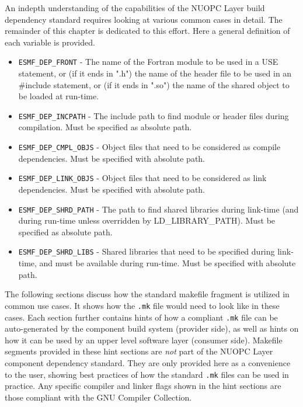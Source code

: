 An indepth understanding of the capabilities of the NUOPC Layer build dependency standard requires looking at various common cases in detail. The remainder of this chapter is dedicated to this effort. Here a general definition of each variable is provided.

\begin{itemize}

\item {\tt ESMF\_DEP\_FRONT} - The name of the Fortran module to be used in a USE statement, or (if it ends in ".h") the name of the header file to be used in an \#include statement, or (if it ends in ".so") the name of the shared object to be loaded at run-time.

\item {\tt ESMF\_DEP\_INCPATH} - The include path to find module or header files during compilation. Must be specified as absolute path.

\item {\tt ESMF\_DEP\_CMPL\_OBJS} - Object files that need to be considered as compile dependencies. Must be specified with absolute path.

\item {\tt ESMF\_DEP\_LINK\_OBJS} - Object files that need to be considered as link dependencies. Must be specified with absolute path.

\item {\tt ESMF\_DEP\_SHRD\_PATH} - The path to find shared libraries during link-time (and during run-time unless overridden by LD\_LIBRARY\_PATH). Must be specified as absolute path.

\item {\tt ESMF\_DEP\_SHRD\_LIBS} - Shared libraries that need to be specified during link-time, and must be available during run-time. Must be specified with absolute path.

\end{itemize}

The following sections discuss how the standard makefile fragment is utilized in common use cases. It shows how the {\tt .mk} file would need to look like in these cases. Each section further contains hints of how a compliant {\tt .mk} file can be auto-generated by the component build system (provider side), as well as hints on how it can be used by an upper level software layer (consumer side). Makefile segments provided in these hint sections are {\em not} part of the NUOPC Layer component dependency standard. They are only provided here as a convenience to the user, showing best practices of how the standard {\tt .mk} files can be used in practice. Any specific compiler and linker flags shown in the hint sections are those compliant with the GNU Compiler Collection. 

